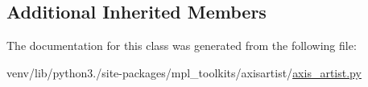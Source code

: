 \subsection*{Additional Inherited Members}


The documentation for this class was generated from the following file\+:\begin{DoxyCompactItemize}
\item 
venv/lib/python3./site-\/packages/mpl\+\_\+toolkits/axisartist/\hyperlink{axisartist_2axis__artist_8py}{axis\+\_\+artist.\+py}\end{DoxyCompactItemize}
